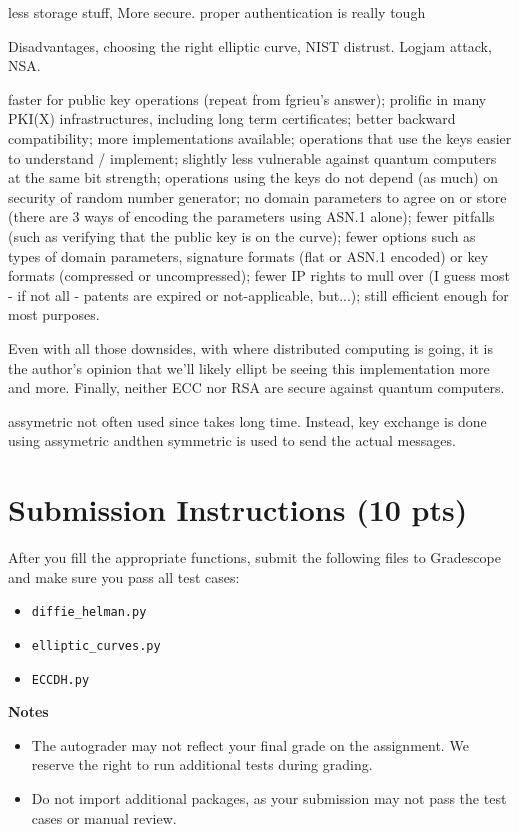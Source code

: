 \documentclass{article}
\begin{document}
less storage stuff, More secure. proper authentication is really tough

Disadvantages, choosing the right elliptic curve, NIST distrust. Logjam attack, NSA.




faster for public key operations (repeat from fgrieu's answer);
prolific in many PKI(X) infrastructures, including long term certificates;
better backward compatibility;
more implementations available;
operations that use the keys easier to understand / implement;
slightly less vulnerable against quantum computers at the same bit strength;
operations using the keys do not depend (as much) on security of random number generator;
no domain parameters to agree on or store (there are 3 ways of encoding the parameters using ASN.1 alone);
fewer pitfalls (such as verifying that the public key is on the curve);
fewer options such as types of domain parameters, signature formats (flat or ASN.1 encoded) or key formats (compressed or uncompressed);
fewer IP rights to mull over (I guess most - if not all - patents are expired or not-applicable, but...);
still efficient enough for most purposes.


Even with all those downsides, with where distributed computing is going, it is the author's opinion that we'll likely ellipt be seeing this implementation more and more. Finally, neither ECC nor RSA are secure against quantum computers.

assymetric not often used since takes long time. Instead, key exchange is done using assymetric andthen symmetric is used to send the actual messages.


\section*{Submission Instructions (10 pts)}
    After you fill the appropriate functions, submit the following files to Gradescope and make sure you pass all test cases:
    \begin{itemize}
        \item \lstinline{diffie_helman.py}
        \item \lstinline{elliptic_curves.py}
        \item \lstinline{ECCDH.py}
    \end{itemize}

    \vspace{3mm}
    \textbf{Notes}
    \begin{itemize}
        \item The autograder may not reflect your final grade on the assignment. We reserve the right to run additional tests during grading.
        \item Do not import additional packages, as your submission may not pass the test cases or manual review.
    \end{itemize}
\end{document}
